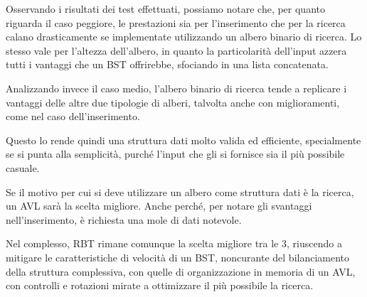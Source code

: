 \documentclass{article}
\begin{document}
Osservando i risultati dei test effettuati, possiamo notare che, per quanto riguarda il caso peggiore, le prestazioni sia per l'inserimento che per la ricerca calano drasticamente se implementate utilizzando un albero binario di ricerca. Lo stesso vale per l'altezza dell'albero, in quanto la particolarità dell'input azzera tutti i vantaggi che un BST offrirebbe, sfociando in una lista concatenata.

\bigskip
Analizzando invece il caso medio, l'albero binario di ricerca tende a replicare i vantaggi delle altre due tipologie di alberi, talvolta anche con miglioramenti, come nel caso dell'inserimento.

Questo lo rende quindi una struttura dati molto valida ed efficiente, specialmente se si punta alla semplicità, purché l'input che gli si fornisce sia il più possibile casuale.

\bigskip
Se il motivo per cui si deve utilizzare un albero come struttura dati è la ricerca, un AVL sarà la scelta migliore. Anche perché, per notare gli svantaggi nell'inserimento, è richiesta una mole di dati notevole.

\bigskip
Nel complesso, RBT rimane comunque la scelta migliore tra le 3, riuscendo a mitigare le caratteristiche di velocità di un BST, noncurante del bilanciamento della struttura complessiva, con quelle di organizzazione in memoria di un AVL, con controlli e rotazioni mirate a ottimizzare il più possibile la ricerca.
\end{document}
